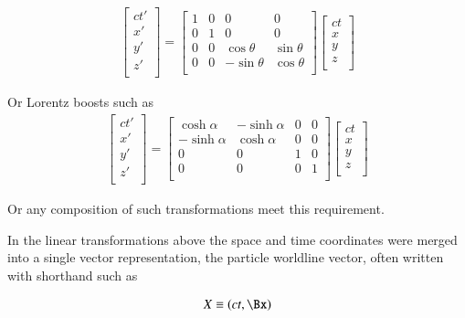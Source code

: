 \documentclass{article}
\begin{document}
\begin{align}
\begin{bmatrix}
ct' \\
x' \\
y' \\
z' \\
\end{bmatrix}
=
\begin{bmatrix}
1 & 0 & 0 & 0 \\
0 & 1 & 0 & 0 \\
0 & 0 & \cos\theta & \sin\theta \\
0 & 0 & -\sin\theta & \cos\theta \\
\end{bmatrix}
\begin{bmatrix}
ct \\
x \\
y \\
z \\
\end{bmatrix}
\end{align}

Or Lorentz boosts such as
\begin{align}
\begin{bmatrix}
ct' \\
x' \\
y' \\
z' \\
\end{bmatrix}
=
\begin{bmatrix}
\cosh\alpha & -\sinh\alpha & 0 & 0 \\
-\sinh\alpha & \cosh\alpha & 0 & 0 \\
0 & 0 & 1 & 0 \\
0 & 0 & 0 & 1 \\
\end{bmatrix}
\begin{bmatrix}
ct \\
x \\
y \\
z \\
\end{bmatrix}
\end{align}

Or any composition of such transformations meet this requirement.

In the linear transformations above the space and time coordinates were merged into a single vector representation,
the particle worldline vector, often written with shorthand such as

\begin{align}
X \equiv (ct, \Bx)
\end{align}
\end{document}

